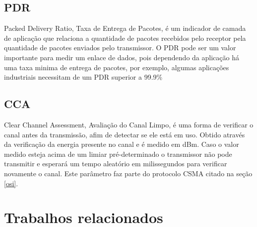 \subsection*{PDR}
Packed Delivery Ratio, Taxa de Entrega de Pacotes, é um indicador de camada de aplicação que relaciona a quantidade de pacotes recebidos pelo receptor pela quantidade de pacotes enviados pelo transmissor. O PDR pode ser um valor importante para medir um enlace de dados, pois dependendo da aplicação há uma taxa minima de entrega de pacotes, por exemplo, algumas aplicações industriais necessitam de um PDR superior a 99.9\%

\subsection*{CCA}
Clear Channel Assessment, Avaliação do Canal Limpo, é uma forma de verificar o canal antes da transmissão, afim de detectar se ele está em uso. Obtido através da verificação da energia presente no canal e é medido em dBm. Caso o valor medido esteja acima de um limiar pré-determinado o transmissor não pode transmitir e esperará um tempo aleatório em milissegundos para verificar novamente o canal. Este parâmetro faz parte do protocolo CSMA citado na seção \ref{osi}.

\section{Trabalhos relacionados}
